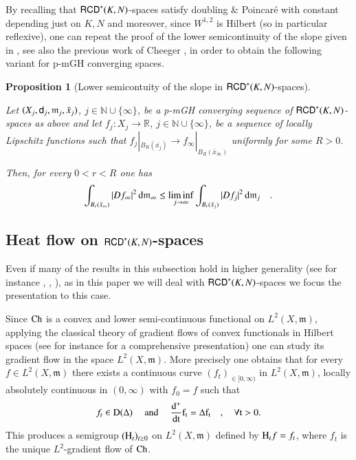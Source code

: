 \documentclass[11pt,reqno]{amsart}
\newcommand{\Ch}{{\rm Ch}}
\newcommand{\dom}{\rm D}
\newcommand{\mm}{\mathfrak m}
\newcommand{\sfd}{{\sf d}}
\renewcommand{\H}{{\rm H}}
\renewcommand{\d}{{\rm{d}}}
\newcommand{\R}{\mathbb{R}}
\newcommand{\N}{\mathbb{N}}
\newcommand{\RCD}{{\sf RCD}}
\newtheorem{proposition}[theorem]{Proposition}
\theoremstyle{definition}
\theoremstyle{remark}
\theoremstyle{remark}
\theoremstyle{remark}
\theoremstyle{remark}
\theoremstyle{remark}
\theoremstyle{remark}
\theoremstyle{remark}
\begin{document}
By recalling that $\RCD^*(K,N)$-spaces satisfy doubling \& Poincar\'e with constant depending just on $K,N$ and moreover, since $W^{1,2}$ is Hilbert (so in particular reflexive),  one can repeat the proof of the lower semicontinuity of the slope given in \cite[Theorem 8.4]{ACD}, see also the previous work of Cheeger \cite{Cheeger97}, in order to obtain the following variant for p-mGH converging spaces.

\begin{proposition}[Lower semicontuity of the slope in $\RCD^*(K,N)$-spaces] \label{Prop:LSCSlope}

Let $(X_j, \sfd_j, \mm_j, \bar{x}_j)$, $j\in \N\cup \{\infty\}$, be a p-mGH converging sequence of $\RCD^*(K,N)$-spaces as above and  let   $f_j:X_j \to \R$, $j \in \N\cup \{\infty\}$, be  a sequence of locally Lipschitz   functions such that  $f_j|_{B_R(\bar{x_j})} \to f_\infty|_{B_R(\bar{x}_\infty)}$ uniformly for some $R>0$.

Then, for every $0<r<R$ one has
\begin{equation}\label{eq:lscSlope}
\int_{B_r(\bar{x}_\infty)} |Df_\infty|^2 \, \d \mm_\infty \leq \liminf_{j\to \infty}  \int_{B_r(\bar{x}_j )} |Df_j|^2 \, \d \mm_j\quad. 
\end{equation} 
\end{proposition} 

\subsection{Heat flow on $\RCD^*(K,N)$-spaces}\label{SS:Heat}
Even if many of the results in this subsection hold in higher generality (see for instance \cite{AGMR2012}, \cite{AGS11a}, \cite{AGS11b}), as in this paper we will deal with $\RCD^*(K,N)$-spaces we focus the presentation to this case.

Since  $\Ch$ is a convex and lower semi-continuous functional on $L^2(X,\mm)$, applying the classical theory of gradient flows of  convex functionals in Hilbert spaces (see for instance \cite{Ambrosio-Gigli-Savare08} for a comprehensive presentation) one can study its gradient flow  in the space $L^2(X,\mm)$. More precisely one obtains that for every $f \in L^2(X,\mm)$ there exists a continuous curve $(f_t)_{ \in [0,\infty)}$ in $L^2(X,\mm)$, locally absolutely continuous in $(0, \infty)$ with $f_0=f$ such that $$f_t \in \dom(\Delta) \quad \text{ and } \quad  \frac{\d^+}{\d t} f_t = \Delta f_t \quad, \quad \forall t>0. $$ 
This produces a semigroup $(\H_t)_{t\geq 0}$ on $L^2(X,\mm)$ defined by $\H_t f= f_t$, where $f_t$ is the unique $L^2$-gradient flow of $\Ch$.
\end{document}
